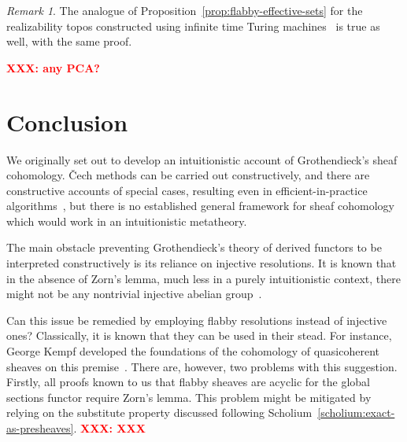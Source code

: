 \documentclass[oneside]{amsart}
\theoremstyle{definition}
\theoremstyle{plain}
\theoremstyle{remark}
\newtheorem{rem}[defn]{Remark}
\newcommand{\XXX}[1]{\textbf{\textcolor{red}{XXX: #1}}}
\renewcommand{\_}{\mathpunct{.}\,}
\begin{document}
\begin{rem}The analogue of Proposition~\ref{prop:flabby-effective-sets}
for the realizability topos
constructed using infinite time Turing
machines~\cite{bauer:injection,hamkins-lewis:ittm} is true as well, with the
same proof.\end{rem}
\XXX{any PCA?}


\section{Conclusion}
\label{sect:conclusion}

We originally set out to develop an intuitionistic account of Grothendieck's
sheaf cohomology. Čech methods can be carried out constructively, and
there are constructive accounts of special cases, resulting even in
efficient-in-practice algorithms~\cite{barakat-lh:homalg,barakat-lh:ext},
but there is no established general framework for sheaf
cohomology which would work in an intuitionistic metatheory.

The main obstacle preventing Grothendieck's theory of derived functors to be interpreted
constructively is its reliance on injective resolutions. It is known that in
the absence of Zorn's lemma, much less in a purely intuitionistic
context, there might not be any nontrivial injective abelian
group~\cite{blass:inj-proj-axc}.

Can this issue be remedied by employing flabby resolutions
instead of injective ones? Classically, it is known that they can be used in
their stead. For instance, George Kempf developed the foundations of the
cohomology of quasicoherent sheaves on this premise~\cite{kempf:cohomology}. There are, however, two problems with this
suggestion. Firstly, all proofs known to us that flabby sheaves are
acyclic for the global sections functor require Zorn's lemma. This problem might
be mitigated by relying on the substitute property discussed
following Scholium~\ref{scholium:exact-as-presheaves}. \XXX{XXX}
\end{document}
